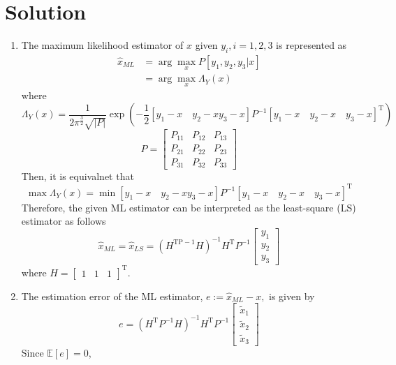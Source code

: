 \documentclass[10pt,a4paper,oneside]{article}
\begin{document}
\section*{Solution}
\begin{enumerate}
\item The maximum likelihood estimator of $x$ given $y_{i}, i=1,2,3$ is represented as
\[
\begin{aligned} \hat{x}_{M L} &=\arg \max _{x} P\left[y_{1}, y_{2}, y_{3} | x\right] \\ &=\arg \max _{x} \Lambda_{Y}(x) \end{aligned}
\]
where
\[
\Lambda_{Y}(x)=\frac{1}{2 \pi^{\frac{3}{2}} \sqrt{|P|}} \exp \left(-\frac{1}{2}\left[y_{1}-x \quad y_{2}-x y_{3}-x\right] P^{-1}\left[y_{1}-x \quad y_{2}-x \quad y_{3}-x\right]^{\mathrm{T}}\right)
\]
\[
P=\left[\begin{array}{lll}{P_{11}} & {P_{12}} & {P_{13}} \\ {P_{21}} & {P_{22}} & {P_{23}} \\ {P_{31}} & {P_{32}} & {P_{33}}\end{array}\right]
\]
Then, it is equivalnet that
\[
\max \Lambda_{Y}(x)=\min \left[y_{1}-x \quad y_{2}-x y_{3}-x\right] P^{-1}\left[y_{1}-x \quad y_{2}-x \quad y_{3}-x\right]^{\mathrm{T}}
\]
Therefore, the given ML estimator can be interpreted as the least-square (LS) estimator as
follows
\[
\hat{x}_{M L}=\hat{x}_{L S}=\left(H^{\mathrm{TP}-1} H\right)^{-1} H^{\mathrm{T}} P^{-1}\left[\begin{array}{c}{y_{1}} \\ {y_{2}} \\ {y_{3}}\end{array}\right]
\]
where $H=\left[\begin{array}{lll}{1} & {1} & {1}\end{array}\right]^{\mathrm{T}}$.
\item The estimation error of the ML estimator, $e :=\hat{x}_{M L}-x,$ is given by
\[
e=\left(H^{\mathrm{T}} P^{-1} H\right)^{-1} H^{\mathrm{T}} P^{-1}\left[\begin{array}{c}{\tilde{x}_{1}} \\ {\tilde{x}_{2}} \\ {\tilde{x}_{3}}\end{array}\right]
\]
Since $\mathbb{E}[e]=0$,
\[
\]
\end{enumerate}
\end{document}
